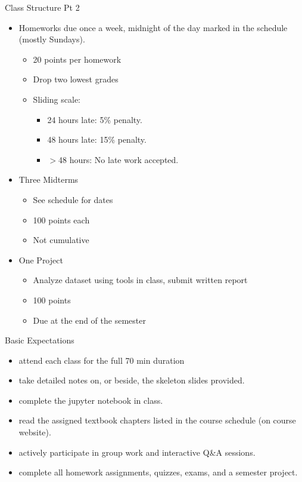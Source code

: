 \documentclass[aspectratio=169,dvipsnames]{beamer}
\begin{document}
\begin{frame}[c]{Class Structure Pt 2}
	\begin{itemize}
		\item Homeworks due once a week, midnight of the day marked in the schedule (mostly Sundays).
		\begin{itemize}
			\item 20 points per homework 
			\item Drop two lowest grades 
			\item Sliding scale: 
			\begin{itemize}
				\item 24 hours late: 5\% penalty.
				\item 48 hours late: 15\% penalty.
				\item $>$48 hours: No late work accepted.
			\end{itemize}
		\end{itemize}
		\item Three Midterms
		\begin{itemize}
			\item See schedule for dates 
			\item 100 points each 
			\item Not cumulative 
		\end{itemize}
		\item One Project 
		\begin{itemize}
			\item Analyze dataset using tools in class, submit written report
			\item 100 points 
			\item Due at the end of the semester
		\end{itemize}
	\end{itemize}
\end{frame}

\begin{frame}[c]{Basic Expectations}
	\begin{itemize}
		\item attend each class for the full 70 min duration
		\item take detailed notes on, or beside, the skeleton slides provided.
		\item complete the jupyter notebook in class. 
		\item read the assigned textbook chapters listed in the course schedule (on course website).
		\item actively participate in group work and interactive Q\&A sessions.
		\item complete all homework assignments, quizzes, exams, and a semester project. 
	\end{itemize}

\end{frame}
\end{document}
